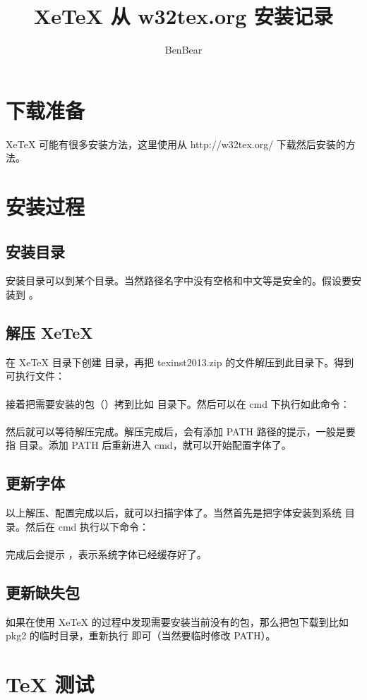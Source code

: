 \documentclass{article}
\title{XeTeX 从 w32tex.org 安装记录}
\author{BenBear}
\begin{document}
\maketitle

\section{下载准备}

XeTeX 可能有很多安装方法，这里使用从 http://w32tex.org/ 下载然后安装的方法。

\section{安装过程}
\subsection{安装目录}
安装目录可以到某个目录。当然路径名字中没有空格和中文等是安全的。假设要安装到  。

\subsection{解压 XeTeX}
在 XeTeX 目录下创建  目录，再把 texinst2013.zip 的文件解压到此目录下。得到可执行文件：\\
\\
接着把需要安装的包（）拷到比如  目录下。然后可以在 cmd 下执行如此命令：\\
\\
然后就可以等待解压完成。解压完成后，会有添加 PATH 路径的提示，一般是要指  目录。添加 PATH 后重新进入 cmd，就可以开始配置字体了。

\subsection{更新字体}
以上解压、配置完成以后，就可以扫描字体了。当然首先是把字体安装到系统  目录。然后在 cmd 执行以下命令：\\
\\
完成后会提示 ，表示系统字体已经缓存好了。

\subsection{更新缺失包}
如果在使用 XeTeX 的过程中发现需要安装当前没有的包，那么把包下载到比如 pkg2 的临时目录，重新执行  即可（当然要临时修改 PATH）。

\section{TeX 测试}
\end{document}
